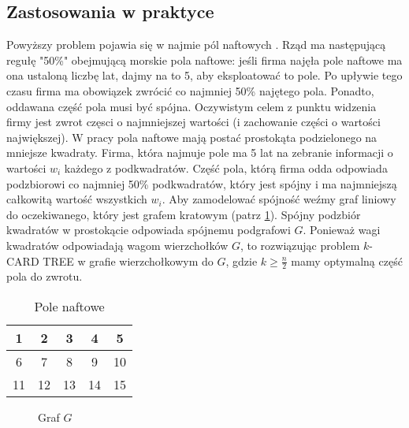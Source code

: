 \documentclass[12pt]{article}
\begin{document}
\subsection{Zastosowania w praktyce}

Powyższy problem pojawia się w najmie pól naftowych \cite{oil_fields}. Rząd ma następującą regułę "50\%" obejmującą morskie pola naftowe: jeśli firma najęła pole naftowe ma ona ustaloną liczbę lat, dajmy na to 5, aby eksploatować to pole. Po upływie tego czasu firma ma obowiązek zwrócić co najmniej 50\% najętego pola. Ponadto, oddawana część pola musi być spójna. Oczywistym celem z punktu widzenia firmy jest zwrot częsci o najmniejszej wartości (i zachowanie części o wartości największej). W pracy \cite{oil_fields} pola naftowe mają postać prostokąta podzielonego na mniejsze kwadraty. Firma, która najmuje pole ma 5 lat na zebranie informacji o wartości $w_i$ każdego z podkwadratów. Część pola, którą firma odda odpowiada podzbiorowi co najmniej 50\% podkwadratów, który jest spójny i ma najmniejszą całkowitą wartość wszystkich $w_i$. Aby zamodelować spójność weźmy graf liniowy do oczekiwanego, który jest grafem kratowym (patrz \ref{fig:G1}). Spójny podzbiór kwadratów w prostokącie odpowiada spójnemu podgrafowi $G$. Ponieważ wagi kwadratów odpowiadają wagom wierzchołków $G$, to rozwiązując problem $k$-CARD TREE w grafie wierzchołkowym do $G$, gdzie $k \geq \frac{n}{2}$ mamy optymalną część pola do zwrotu.

\begin{table}[H]
  \centering
  \begin{tabular}{|c|c|c|c|c|}\hline
      1 & 2 & 3 & 4 & 5\\\hline
      6 & 7 & 8 & 9 & 10\\\hline
      11 & 12 & 13 & 14 & 15\\\hline
  \end{tabular}
  \caption{Pole naftowe} \label{tab:T1}
\end{table}

\begin{figure}[H]
  \centering
  \caption{Graf $G$} \label{fig:G1}
\end{figure}
\end{document}
